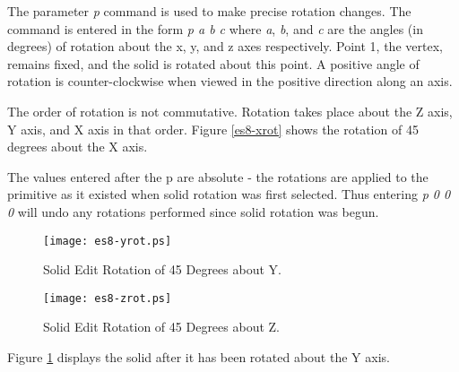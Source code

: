 
The parameter {\em p} command is used to make precise rotation changes.
The
command is entered in the form {\em p a b c} where
{\em a}, {\em b}, and {\em c} are the angles
(in degrees) of rotation about the x, y, and z axes respectively.  Point 1,
the vertex, remains fixed, and the solid is rotated about this point.  A
positive angle of rotation is counter-clockwise when viewed in the positive
direction along an axis.

The order of rotation is not commutative.
Rotation takes place about the
Z axis, Y axis, and X axis in that order.
Figure \ref{es8-xrot} shows the rotation of 45 degrees about the X axis.


The values entered after the p are absolute - the rotations are applied to
the primitive as it existed when solid rotation was first selected.  Thus
entering {\em p 0 0 0} will undo any rotations
performed since solid rotation was begun.

\begin{figure}
\centering \texttt{[image: es8-yrot.ps]}
\caption{Solid Edit Rotation of 45 Degrees about Y.}
\label{es8-yrot}
\end{figure}

\begin{figure}
\centering \texttt{[image: es8-zrot.ps]}
\caption{Solid Edit Rotation of 45 Degrees about Z.}
\label{es8-zrot}
\end{figure}


Figure \ref{es8-yrot} displays the solid
after it has been rotated about the Y axis.


